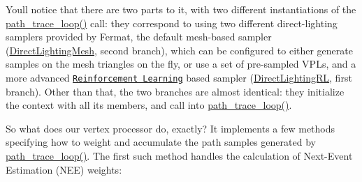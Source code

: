  \begin{DoxyParagraph}{}
You\textquotesingle{}ll notice that there are two parts to it, with two different instantiations of the \hyperlink{_p_t_lib_page_path_trace_loop_anchor}{path\+\_\+trace\+\_\+loop()} call\+: they correspond to using two different direct-\/lighting samplers provided by Fermat, the default mesh-\/based sampler (\hyperlink{struct_direct_lighting_mesh}{Direct\+Lighting\+Mesh}, second branch), which can be configured to either generate samples on the mesh triangles on the fly, or use a set of pre-\/sampled V\+P\+Ls, and a more advanced \href{https://en.wikipedia.org/wiki/Reinforcement_learning}{\tt Reinforcement Learning} based sampler (\hyperlink{struct_direct_lighting_r_l}{Direct\+Lighting\+RL}, first branch). Other than that, the two branches are almost identical\+: they initialize the context with all its members, and call into \hyperlink{_p_t_lib_page_path_trace_loop_anchor}{path\+\_\+trace\+\_\+loop()}.
\end{DoxyParagraph}
\begin{DoxyParagraph}{}
So what does our vertex processor do, exactly? It implements a few methods specifying how to weight and accumulate the path samples generated by \hyperlink{_p_t_lib_page_path_trace_loop_anchor}{path\+\_\+trace\+\_\+loop()}. The first such method handles the calculation of Next-\/\+Event Estimation (N\+EE) weights\+:
\end{DoxyParagraph}

